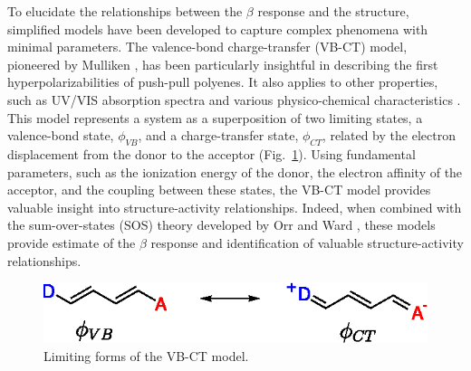 \documentclass[USenglish]{article}
\begin{document}
To elucidate the relationships between the $\beta$ response and the structure, simplified models have been developed to capture complex phenomena with minimal parameters. The valence-bond charge-transfer (VB-CT) model, pioneered by Mulliken \cite{mullikenMolecularCompoundsTheir1952}, has been particularly insightful in describing the first hyperpolarizabilities of push-pull polyenes. It also applies to other properties, such as UV/VIS absorption spectra and various physico-chemical characteristics \cite{benderTheoreticalModelsChargetransfer1986}. This model represents a system as a superposition of two limiting states, a valence-bond state, $\phi_{VB}$, and a charge-transfer state, $\phi_{CT}$, related by the electron displacement from the donor to the acceptor (Fig.~\ref{sc:vbct}). Using fundamental parameters, such as the ionization energy of the donor, the electron affinity of the acceptor, and the coupling between these states, the VB-CT model provides valuable insight into structure-activity relationships.  Indeed, when combined with the sum-over-states (SOS) theory developed by Orr and Ward \cite{orrPerturbationTheoryNonlinear1971}, these models provide estimate of the $\beta$ response and identification of valuable structure-activity relationships.


\begin{figure}[!h]
	\includegraphics[width=.5\linewidth]{Figure1}
	\caption{Limiting forms of the VB-CT model.}
	\label{sc:vbct}
\end{figure}
\end{document}
